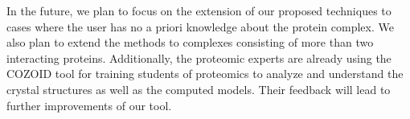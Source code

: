 \documentclass{bmcart}
\begin{document}
In the future, we plan to focus on the extension of our proposed techniques to cases where the user has no a priori knowledge about the protein complex.
We also plan to extend the methods to complexes consisting of more than two interacting proteins. 
Additionally, the proteomic experts are already using the COZOID tool for training students of proteomics to analyze and understand the crystal structures as well as the computed models.
Their feedback will lead to further improvements of our tool.

\end{document}
